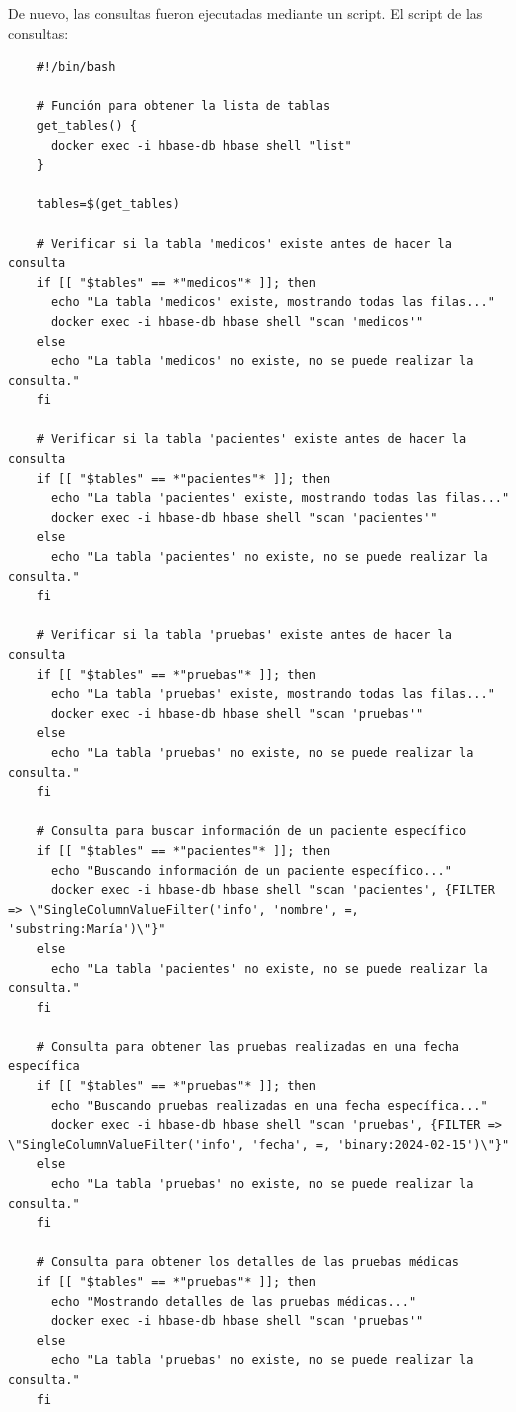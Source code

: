 \documentclass{article}
\begin{document}
De nuevo, las consultas fueron ejecutadas mediante un script. El script de las consultas:

\begin{verbatim}
    #!/bin/bash

    # Función para obtener la lista de tablas
    get_tables() {
      docker exec -i hbase-db hbase shell "list"
    }
    
    tables=$(get_tables)
    
    # Verificar si la tabla 'medicos' existe antes de hacer la consulta
    if [[ "$tables" == *"medicos"* ]]; then
      echo "La tabla 'medicos' existe, mostrando todas las filas..."
      docker exec -i hbase-db hbase shell "scan 'medicos'"
    else
      echo "La tabla 'medicos' no existe, no se puede realizar la consulta."
    fi
    
    # Verificar si la tabla 'pacientes' existe antes de hacer la consulta
    if [[ "$tables" == *"pacientes"* ]]; then
      echo "La tabla 'pacientes' existe, mostrando todas las filas..."
      docker exec -i hbase-db hbase shell "scan 'pacientes'"
    else
      echo "La tabla 'pacientes' no existe, no se puede realizar la consulta."
    fi
    
    # Verificar si la tabla 'pruebas' existe antes de hacer la consulta
    if [[ "$tables" == *"pruebas"* ]]; then
      echo "La tabla 'pruebas' existe, mostrando todas las filas..."
      docker exec -i hbase-db hbase shell "scan 'pruebas'"
    else
      echo "La tabla 'pruebas' no existe, no se puede realizar la consulta."
    fi
    
    # Consulta para buscar información de un paciente específico
    if [[ "$tables" == *"pacientes"* ]]; then
      echo "Buscando información de un paciente específico..."
      docker exec -i hbase-db hbase shell "scan 'pacientes', {FILTER => \"SingleColumnValueFilter('info', 'nombre', =, 'substring:María')\"}"
    else
      echo "La tabla 'pacientes' no existe, no se puede realizar la consulta."
    fi
    
    # Consulta para obtener las pruebas realizadas en una fecha específica
    if [[ "$tables" == *"pruebas"* ]]; then
      echo "Buscando pruebas realizadas en una fecha específica..."
      docker exec -i hbase-db hbase shell "scan 'pruebas', {FILTER => \"SingleColumnValueFilter('info', 'fecha', =, 'binary:2024-02-15')\"}"
    else
      echo "La tabla 'pruebas' no existe, no se puede realizar la consulta."
    fi
    
    # Consulta para obtener los detalles de las pruebas médicas
    if [[ "$tables" == *"pruebas"* ]]; then
      echo "Mostrando detalles de las pruebas médicas..."
      docker exec -i hbase-db hbase shell "scan 'pruebas'"
    else
      echo "La tabla 'pruebas' no existe, no se puede realizar la consulta."
    fi
    
\end{verbatim}
\end{document}

